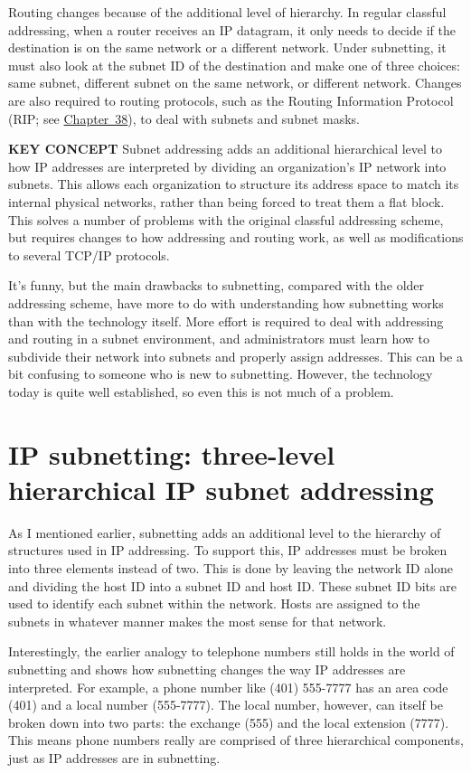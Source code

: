 \documentclass[b5paper,11pt]{memoir}
\begin{document}
Routing changes because of the additional level of hierarchy. In regular
classful addressing, when a router receives an IP datagram, it only
needs to decide if the destination is on the same network or a different
network. Under subnetting, it must also look at the subnet ID of the
destination and make one of three choices: same subnet, different subnet
on the same network, or different network. Changes are also required to
routing protocols, such as the Routing Information Protocol (RIP; see
\protect\hyperlink{ch38.html}{Chapter~38}), to deal with subnets and
subnet masks.


{\textbf{KEY CONCEPT}} Subnet addressing adds an additional hierarchical
level to how IP addresses are interpreted by dividing an organization's
IP network into subnets. This allows each organization to structure its
address space to match its internal physical networks, rather than being
forced to treat them a flat block. This solves a number of problems with
the original classful addressing scheme, but requires changes to how
addressing and routing work, as well as modifications to several TCP/IP
protocols.

It's funny, but the main drawbacks to subnetting, compared with the
older addressing scheme, have more to do with understanding how
subnetting works than with the technology itself. More effort is
required to deal with addressing and routing in a subnet environment,
and administrators must learn how to subdivide their network into
subnets and properly assign addresses. This can be a bit confusing to
someone who is new to subnetting. However, the technology today is quite
well established, so even this is not much of a problem.


\section{IP subnetting: three-level hierarchical IP subnet addressing}

As I mentioned earlier, subnetting adds an additional level to the hierarchy
of structures used in IP addressing. To support this, IP addresses must
be broken into three elements instead of two. This is done by leaving
the network ID alone and dividing the host ID into a subnet ID and host
ID. These subnet ID bits are used to identify each subnet within the
network. Hosts are assigned to the subnets in whatever manner makes the
most sense for that network.

Interestingly, the earlier analogy to telephone numbers still holds in
the world of subnetting and shows how subnetting changes the way IP
addresses are interpreted. For example, a phone number like (401)
555-7777 has an area code (401) and a local number (555-7777). The local
number, however, can itself be broken down into two parts: the exchange
(555) and the local extension (7777). This means phone numbers really
are comprised of three hierarchical components, just as IP addresses are
in subnetting.
\end{document}
